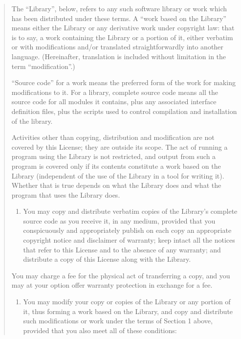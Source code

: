 \documentclass[
]{book}
\providecommand{\tightlist}{%
  \setlength{\itemsep}{0pt}\setlength{\parskip}{0pt}}
\theoremstyle{definition}
\theoremstyle{definition}
\theoremstyle{definition}
\theoremstyle{definition}
\theoremstyle{remark}
\begin{document}
\begin{quote}
The ``Library'', below, refers to any such software library or
work which has been distributed under these terms. A ``work
based on the Library'' means either the Library or any derivative
work under copyright law: that is to say, a work containing the
Library or a portion of it, either verbatim or with
modifications and/or translated straightforwardly into another
language. (Hereinafter, translation is included without
limitation in the term ``modification''.)

``Source code'' for a work means the preferred form of the work
for making modifications to it. For a library, complete source
code means all the source code for all modules it contains, plus
any associated interface definition files, plus the scripts used
to control compilation and installation of the library.

Activities other than copying, distribution and modification are
not covered by this License; they are outside its scope. The
act of running a program using the Library is not restricted,
and output from such a program is covered only if its contents
constitute a work based on the Library (independent of the use
of the Library in a tool for writing it). Whether that is true
depends on what the Library does and what the program that uses
the Library does.

\begin{enumerate}
\def\labelenumi{\arabic{enumi}.}
\tightlist
\item
  You may copy and distribute verbatim copies of the Library's
  complete source code as you receive it, in any medium, provided
  that you conspicuously and appropriately publish on each copy an
  appropriate copyright notice and disclaimer of warranty; keep
  intact all the notices that refer to this License and to the
  absence of any warranty; and distribute a copy of this License
  along with the Library.
\end{enumerate}

You may charge a fee for the physical act of transferring a
copy, and you may at your option offer warranty protection in
exchange for a fee.

\begin{enumerate}
\def\labelenumi{\arabic{enumi}.}
\setcounter{enumi}{1}
\tightlist
\item
  You may modify your copy or copies of the Library or any
  portion of it, thus forming a work based on the Library, and
  copy and distribute such modifications or work under the terms
  of Section 1 above, provided that you also meet all of these
  conditions:
\end{enumerate}


\end{quote}
\end{document}
